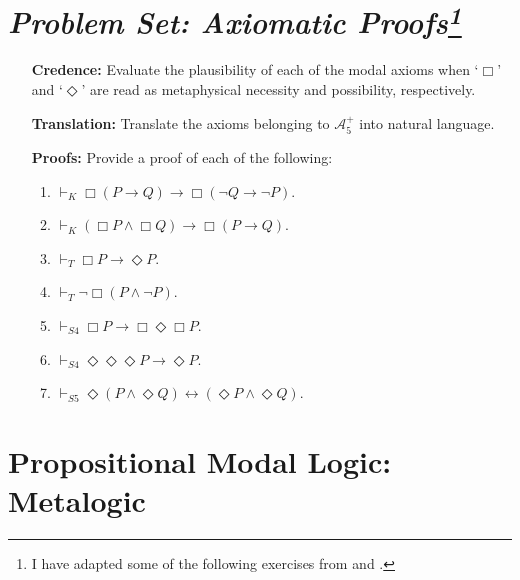 \documentclass[a4paper, 11pt]{article} %
\renewcommand{\L}[0]{\mathcal{L}}
\begin{document}
\section*{\it Problem Set: Axiomatic Proofs\footnote{I have adapted some of the following exercises from \citet{Studd2016} and \citet{Sider2010}.}}

\begin{enumerate}[leftmargin=1.2in,labelsep=.15in] 
\item[\bf Credence:] Evaluate the plausibility of each of the modal axioms when `$\Box$' and `$\Diamond$' are read as metaphysical necessity and possibility, respectively.
\item[\bf Translation:] Translate the axioms belonging to $\mathcal{A}_5^+$ into natural language. 
\item[\bf Proofs:] Provide a proof of each of the following: 
	\begin{enumerate}[label=(\arabic*),resume]\small
	\item $\vdash_{K} \Box(P\rightarrow Q)\rightarrow\Box(\neg Q\rightarrow \neg P)$.
	\item $\vdash_{K} (\Box P\wedge \Box Q)\rightarrow\Box(P\rightarrow Q)$.
	\item $\vdash_{T} \Box P\rightarrow\Diamond P$.
	\item $\vdash_{T} \neg\Box(P\wedge \neg P)$.
	\item $\vdash_{S4} \Box P\rightarrow\Box\Diamond\Box P$.
	\item $\vdash_{S4} \Diamond\Diamond\Diamond P\rightarrow\Diamond P$.
	\item $\vdash_{S5} \Diamond(P\wedge\Diamond Q)\leftrightarrow(\Diamond P\wedge\Diamond Q)$.
	\end{enumerate}
\end{enumerate}







\section*{\sc Propositional Modal Logic: Metalogic}
\end{document}

